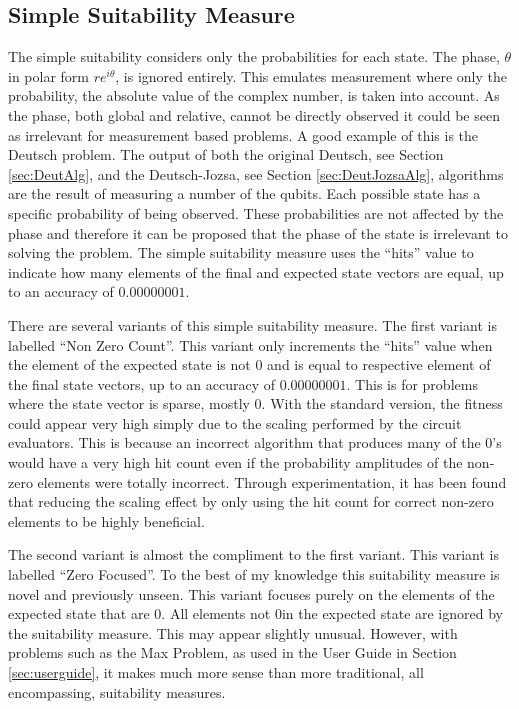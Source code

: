 \subsection{Simple Suitability Measure}
\label{sec:simplsuitmeas}
The simple suitability considers only the probabilities for each state.
The phase, $\theta$ in polar form $re^{i\theta}$, is ignored entirely.
This emulates measurement where only the probability, the absolute value of the complex number, is taken into account.
As the phase, both global and relative, cannot be directly observed it could be seen as irrelevant for measurement based problems.
A good example of this is the Deutsch problem.
The output of both the original Deutsch, see Section \ref{sec:DeutAlg}, and the Deutsch-Jozsa, see Section \ref{sec:DeutJozsaAlg}, algorithms are the result of measuring a number of the qubits.
Each possible state has a specific probability of being observed.
These probabilities are not affected by the phase and therefore it can be proposed that the phase of the state is irrelevant to solving the problem.
The simple suitability measure uses the ``hits'' value to indicate how many elements of the final and expected state vectors are equal, up to an accuracy of $0.00000001$.

There are several variants of this simple suitability measure.
The first variant is labelled ``Non Zero Count''.
This variant only increments the ``hits'' value when the element of the expected state is not $0$ and is equal to respective element of the final state vectors, up to an accuracy of $0.00000001$.
This is for problems where the state vector is sparse, mostly $0$.
With the standard version, the fitness could appear very high simply due to the scaling performed by the circuit evaluators.
This is because an incorrect algorithm that produces many of the $0$'s would have a very high hit count even if the probability amplitudes of the non-zero elements were totally incorrect.
Through experimentation, it has been found that reducing the scaling effect by only using the hit count for correct non-zero elements to be highly beneficial.

The second variant is almost the compliment to the first variant.
This variant is labelled ``Zero Focused''.
To the best of my knowledge this suitability measure is novel and previously unseen.
This variant focuses purely on the elements of the expected state that are $0$.
All elements not $0$in  the expected state are ignored by the suitability measure.
This may appear slightly unusual.
However, with problems such as the Max Problem, as used in the User Guide in Section \ref{sec:userguide}, it makes much more sense than more traditional, all encompassing, suitability measures.

